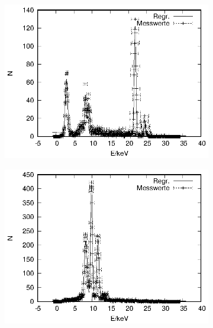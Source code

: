 \begin{figure}[!h]
  \centering
  \begin{subfigure}[h]{0.5\textwidth}
    \centering
    \includegraphics{data/Massenanteil/ag.eps}
  \end{subfigure}%
  \begin{subfigure}[h]{0.5\textwidth}
    \centering
    \includegraphics{data/Massenanteil/au.eps}
  \end{subfigure}
  \begin{subfigure}[h]{0.5\textwidth}
    \centering

\end{subfigure}
\end{figure}
